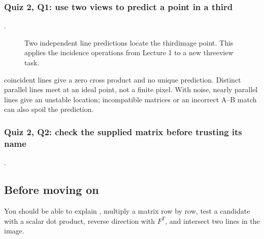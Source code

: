 \documentclass[letterpaper,11pt,english,openany,oneside]{jupyterBook}
\begin{document}
\subsubsection{Quiz 2, Q1: use two views to predict a point in a third}
\label{\detokenize{lectures/lecture04/epipolar-practice:quiz-2-q1-use-two-views-to-predict-a-point-in-a-third}}
\sphinxAtStartPar
{} {\hyperref[\detokenize{lectures/lecture04/quiz-workbook:quiz-3-q1}]{}}.

\begin{figure}[H]
\centering
\capstart

\noindent{}
\caption{Two independent line predictions locate the third\sphinxhyphen{}image point. This applies the incidence operations from Lecture 1 to a new three\sphinxhyphen{}view task.}\label{\detokenize{lectures/lecture04/epipolar-practice:fig-lec04-third-view}}\end{figure}

\sphinxAtStartPar
{} coincident lines give a zero cross product and no unique prediction. Distinct parallel lines meet at an ideal point, not a finite pixel. With noise, nearly parallel lines give an unstable location; incompatible matrices or an incorrect A–B match can also spoil the prediction.


\subsubsection{Quiz 2, Q2: check the supplied matrix before trusting its name}
\label{\detokenize{lectures/lecture04/epipolar-practice:quiz-2-q2-check-the-supplied-matrix-before-trusting-its-name}}
\sphinxAtStartPar
{} {\hyperref[\detokenize{lectures/lecture04/quiz-workbook:quiz-3-q2}]{}}.


\subsection{Before moving on}
\label{\detokenize{lectures/lecture04/epipolar-practice:before-moving-on}}
\sphinxAtStartPar
You should be able to explain , multiply a matrix row by row, test a candidate with a scalar dot product, reverse direction with \(F^T\), and intersect two lines in the  image.
\end{document}
